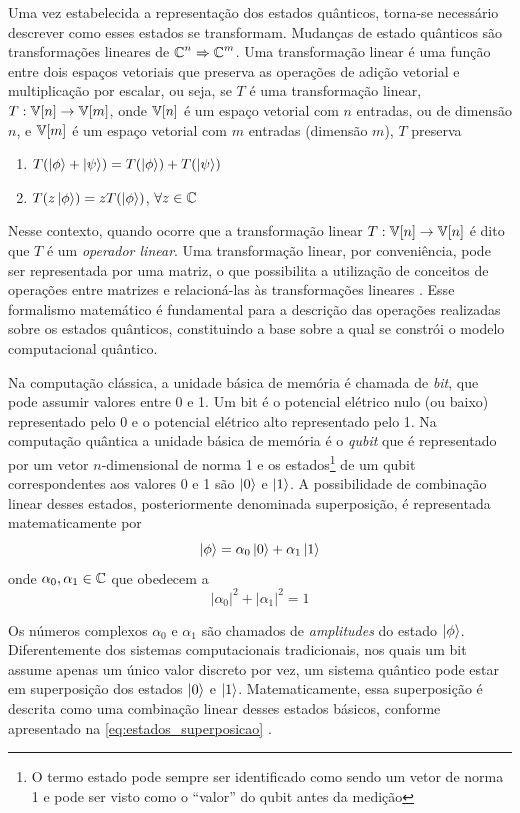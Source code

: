 Uma vez estabelecida a representação dos estados quânticos, torna-se necessário descrever como esses estados se transformam. Mudanças de estado quânticos são transformações lineares de $\operatorname{\mathbb{C}}^n\Rightarrow \operatorname{\mathbb{C}}^m$. Uma transformação linear é uma função entre dois espaços vetoriais que preserva as operações de adição vetorial e multiplicação por escalar, ou seja, se $T$ é uma transformação linear, $T:\operatorname{\mathbb{V}}[n]\rightarrow\operatorname{\mathbb{V}}[m]$, onde $\operatorname{\mathbb{V}}[n]$ é um espaço vetorial com $n$ entradas, ou de dimensão $n$, e $\operatorname{\mathbb{V}}[m]$ é um espaço vetorial com $m$ entradas (dimensão $m$), $T$ preserva
\begin{enumerate}
    \item $T(\ket{\phi}+\ket{\psi}) = T(\ket{\phi})+T(\ket{\psi})$
    \item $T(z\ket{\phi})=zT(\ket{\phi})$, $\forall z\in\operatorname{\mathbb{C}}$
\end{enumerate}

Nesse contexto, quando ocorre que a transformação linear $T:\operatorname{\mathbb{V}}[n]\rightarrow\operatorname{\mathbb{V}}[n]$ é dito que $T$ é um \textit{operador linear}. Uma transformação linear, por conveniência, pode ser representada por uma matriz, o que possibilita a utilização de conceitos de operações entre matrizes e relacioná-las às transformações lineares \cite{dettman1986introduction}. Esse formalismo matemático é fundamental para a descrição das operações realizadas sobre os estados quânticos, constituindo a base sobre a qual se constrói o modelo computacional quântico.

Na computação clássica, a unidade básica de memória é chamada de \textit{bit}, que pode assumir valores entre 0 e 1. Um bit é o potencial elétrico nulo (ou baixo) representado pelo 0 e o potencial elétrico alto representado pelo 1. Na computação quântica a unidade básica de memória é o \textit{qubit} que é representado por um vetor $n$-dimensional de norma 1 e os estados\footnote{O termo estado pode sempre ser identificado como sendo um vetor de norma 1 e pode ser visto como o ``valor'' do qubit antes da medição} de um qubit correspondentes aos valores 0 e 1 são $\ket{0}$ e $\ket{1}$. A possibilidade de combinação linear desses estados, posteriormente denominada superposição, é representada matematicamente por
    \begin{equation}
        \label{eq:estados_superposicao}
        \ket{\phi}=\alpha_0\ket{0}+\alpha_1\ket{1}
    \end{equation}
    onde $\alpha_0, \alpha_1\in\operatorname{\mathbb{C}}$ que obedecem a
    $$
        |\alpha_0|^2+|\alpha_1|^2=1
    $$
    
Os números complexos $\alpha_0$ e $\alpha_1$ são chamados de \textit{amplitudes} do estado $\ket{\phi}$. Diferentemente dos sistemas computacionais tradicionais, nos quais um bit assume apenas um único valor discreto por vez, um sistema quântico pode estar em superposição dos estados $\ket{0}$ e $\ket{1}$. Matematicamente, essa superposição é descrita como uma combinação linear desses estados básicos, conforme apresentado na \autoref{eq:estados_superposicao} \cite[pág. 13]{nielsen_quantum_2002}.
    
